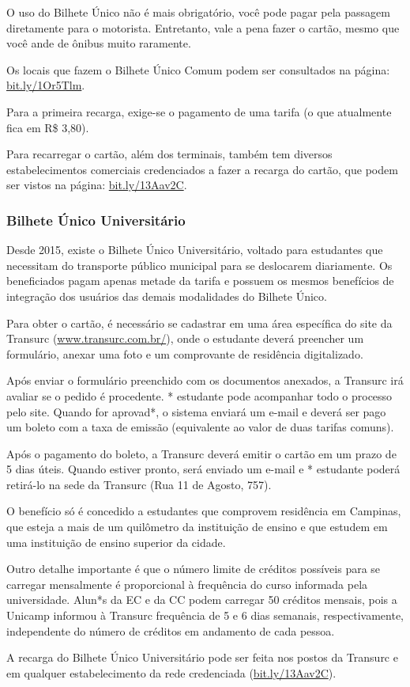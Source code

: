 O uso do Bilhete Único não é mais obrigatório, você pode pagar pela passagem
diretamente para o motorista. Entretanto, vale a pena fazer o cartão, mesmo
que você ande de ônibus muito raramente.

Os locais que fazem o Bilhete Único Comum podem ser consultados na página: 
\url{bit.ly/1Or5Tlm}.

Para a primeira recarga, exige-se o pagamento de uma tarifa (o que atualmente
fica em R\$ 3,80).

Para recarregar o cartão, além dos terminais, também tem diversos
estabelecimentos comerciais credenciados a fazer a recarga do cartão, que podem
ser vistos na página: \url{bit.ly/13Aav2C}.

\subsubsection{Bilhete Único Universitário}

Desde 2015, existe o Bilhete Único Universitário, voltado para estudantes que
necessitam do transporte público municipal para se deslocarem diariamente. Os
beneficiados pagam apenas metade da tarifa e possuem os mesmos benefícios de
integração dos usuários das demais modalidades do Bilhete Único.

Para obter o cartão, é necessário se cadastrar em uma área específica do site
da Transurc (\url{www.transurc.com.br/}), onde o estudante deverá preencher
um formulário, anexar uma foto e um comprovante de residência digitalizado.

Após enviar o formulário preenchido com os documentos anexados, a Transurc
irá avaliar se o pedido é procedente. * estudante pode acompanhar todo o
processo pelo site. Quando for aprovad*, o sistema enviará um e-mail e deverá
ser pago um boleto com a taxa de emissão (equivalente ao valor de duas
tarifas comuns).

Após o pagamento do boleto, a Transurc deverá emitir o cartão em um prazo de
5 dias úteis. Quando estiver pronto, será enviado um e-mail e * estudante
poderá retirá-lo na sede da Transurc (Rua 11 de Agosto, 757).

O benefício só é concedido a estudantes que comprovem residência em Campinas,
que esteja a mais de um quilômetro da instituição de ensino e que estudem em
uma instituição de ensino superior da cidade.

Outro detalhe importante é que o número limite de créditos possíveis para se
carregar mensalmente é proporcional à frequência do curso informada pela
universidade. Alun*s da EC e da CC podem carregar 50 créditos mensais, pois
a Unicamp informou à Transurc frequência de 5 e 6 dias semanais,
respectivamente, independente do número de créditos em andamento de cada
pessoa.

A recarga do Bilhete Único Universitário pode ser feita nos postos da
Transurc e em qualquer estabelecimento da rede credenciada
(\url{bit.ly/13Aav2C}).

